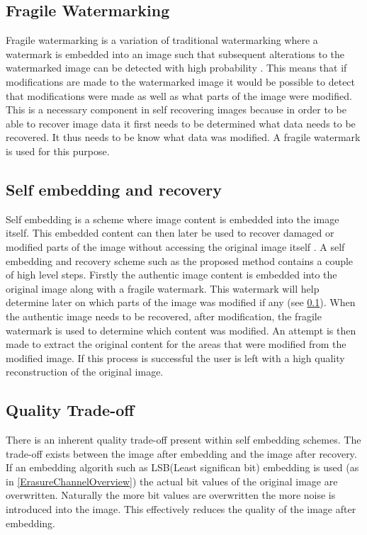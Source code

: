 \documentclass[11pt]{article}
\begin{document}
\subsection{Fragile Watermarking}
\label{introFragWatermarking}
Fragile watermarking is a variation of traditional watermarking where a watermark is embedded into an image such that subsequent alterations to the watermarked image can be detected with high probability \cite{lin1999review}.
This means that if modifications are made to the watermarked image it would be possible to detect that modifications were made as well as what parts of the image were modified.
This is a necessary component in self recovering images because in order to be able to recover image data it first needs to be determined what data needs to be recovered.
It thus needs to be know what data was modified.
A fragile watermark is used for this purpose. 

\subsection{Self embedding and recovery}
\label{introSelfEmbedRecovery}
Self embedding is a scheme where image content is embedded into the image itself. This embedded content can then later be used to recover damaged or modified parts of the image without accessing the original image itself \cite{fridrich1999images}.
A self embedding and recovery scheme such as the proposed method contains a couple of high level steps.
Firstly the authentic image content is embedded into the original image along with a fragile watermark.
This watermark will help determine later on which parts of the image was modified if any (see \ref{introFragWatermarking}).
When the authentic image needs to be recovered, after modification, the fragile watermark is used to determine which content was modified.
An attempt is then made to extract the original content for the areas that were modified from the modified image.
If this process is successful the user is left with a high quality reconstruction of the original image.

\subsection{Quality Trade-off}
\label{introQualityTrade}
There is an inherent quality trade-off present within self embedding schemes.
The trade-off exists between the image after embedding and the image after recovery.
If an embedding algorith such as LSB(Least significan bit) embedding is used (as in \ref{ErasureChannelOverview}) the actual bit values of the original image are overwritten.
Naturally the more bit values are overwritten the more noise is introduced into the image.
This effectively reduces the quality of the image after embedding.
\end{document}

